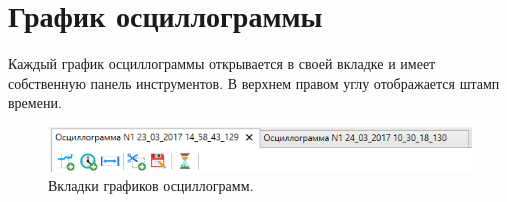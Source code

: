 \documentclass[a4paper,12pt]{article}
\begin{document}
 
 
 
\section*{\hspace{.5cm} График осциллограммы} 
\hspace{.5cm}Каждый график осциллограммы открывается в своей вкладке и имеет собственную панель инструментов. В верхнем правом углу отображается штамп времени.  
 
 
\begin{figure}[h] 
\centering 
\includegraphics[width=60ex]{image/Screenshot_2.png} 
\caption{Вкладки графиков осциллограмм.} 
\end{figure} 
\end{document}

